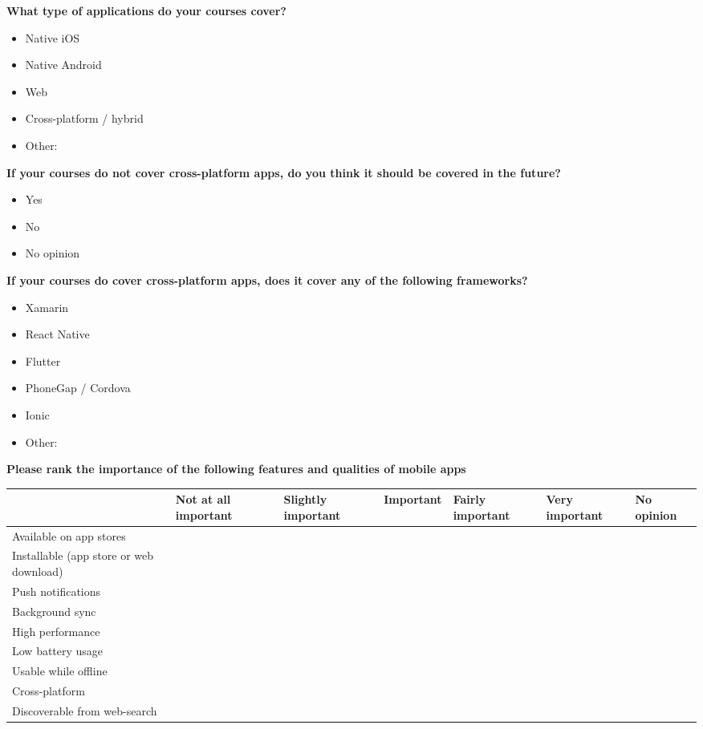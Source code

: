 \documentclass[a4paper,12pt]{article}
\begin{document}
\textbf{What type of applications do your courses cover?}
\begin{itemize}
    \item Native iOS
    \item Native Android
    \item Web
    \item Cross-platform / hybrid
    \item Other:
\end{itemize}

\textbf{If your courses do not cover cross-platform apps, do you think it should be covered in the future?}
\begin{itemize}
    \item Yes
    \item No
    \item No opinion
\end{itemize}

\textbf{If your courses do cover cross-platform apps, does it cover any of the following frameworks?}
\begin{itemize}
    \item Xamarin
    \item React Native
    \item Flutter
    \item PhoneGap / Cordova
    \item Ionic
    \item Other:
\end{itemize}

\textbf{Please rank the importance of the following features and qualities of mobile apps}

\begin{tabular}{|p{3cm}|p{1.7cm}|p{1.7cm}|p{1.6cm}|p{1.7cm}|p{1.6cm}|p{1.4cm}|}
  \hline
     & Not at all important  & Slightly important  &  Important & Fairly important  & Very important  & No opinion \\
  \hline
  Available on app stores   &   &   &   &   &   &  \\
  \hline
  Installable (app store or web download)   &   &   &   &   &   & \\
  \hline
   Push notifications  &   &   &   &   &   & \\
  \hline
   Background sync   &   &   &   &   &   & \\
  \hline
   High performance  &   &   &   &   &   & \\
  \hline
   Low battery usage  &   &   &   &   &   & \\
  \hline
   Usable while offline &   &   &   &   &   & \\
  \hline
   Cross-platform  &   &   &   &   &   & \\
  \hline
   Discoverable from web-search  &   &   &   &   &   & \\
  \hline
\end{tabular}
\end{document}
